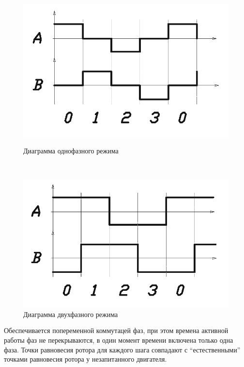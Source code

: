 \begin{figure}
    \centering
    \begin{minipage}{0.5\textwidth}
        \centering
        \includegraphics[width=\linewidth, keepaspectratio]
                        {./src/pictures/control_algo/one_phase_algo}
        \caption{Диаграмма однофазного режима}
        \label{pic_one_phase_algo}
    \end{minipage}~
    \begin{minipage}{0.5\textwidth}
        \centering
        \includegraphics[width=\linewidth, keepaspectratio]
                        {./src/pictures/control_algo/two_phase_algo}
        \caption{Диаграмма двухфазного режима}
        \label{pic_two_phase_algo}
    \end{minipage}
\end{figure}

Обеспечивается попеременной коммутацей фаз, при этом времена активной работы фаз
не перекрываются, в один момент времени включена только одна фаза. Точки равновесия
ротора для каждого шага совпадают с ``естественными'' точками равновесия ротора у
незапитанного двигателя.

